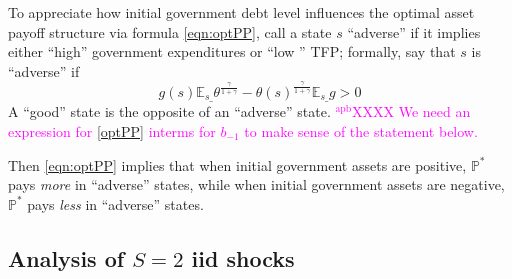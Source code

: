 \documentclass[12pt]{article}
\newcommand{\apb}[1]{\textcolor{magenta}{$^{\textrm{apb}}${#1}}}
\newcommand{\EE}{\mathbb E}
\begin{document}
To appreciate how  initial government debt level influences the optimal asset payoff structure via formula \eqref{eqn:optPP}, call a
 state $s$ ``adverse''  if it implies either ``high'' government expenditures or ``low '' TFP; formally, say that  $s$ is ``adverse'' if
\[   g(s)\EE_{s\_}\theta^\frac{\gamma}{1+\gamma}-\theta(s)^\frac\gamma{1+\gamma}\EE_{s\_} g >0\]
A ``good'' state is the opposite of an ``adverse'' state.
\apb{XXXX We need an expression for \eqref{optPP} interms for $b_{-1}$ to make sense of the statement below. }

Then \eqref{eqn:optPP} implies that
 when initial government assets are positive, $\mathbb{P}^*$   pays {\em more} in ``adverse'' states, while when initial government assets are
 negative, $\mathbb{P}^*$  pays {\em less} in ``adverse'' states.  

%
%		
%	
%			

\subsection{Analysis of $S=2$ iid shocks} %
\end{document}
